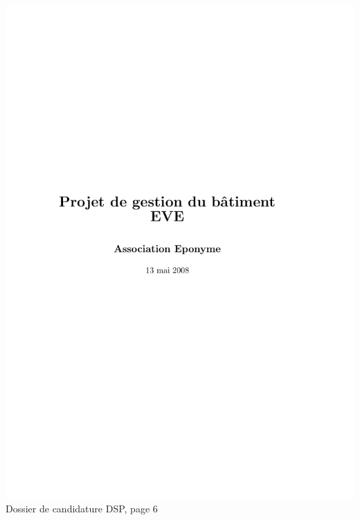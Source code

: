 \includegraphics[scale=0.85,trim=20mm 20mm 20mm 20mm,clip,page=6]{annexes/candidature_dsp.pdf} \\
Dossier de candidature DSP, page 6
\newpage
